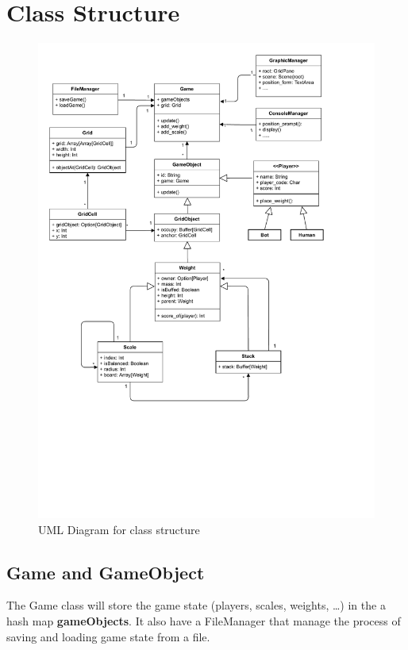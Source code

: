 \documentclass[12pt]{article}
\begin{document}
\section{Class Structure}
\begin{figure}
  \centering
  \caption{UML Diagram for class structure}
  \vspace*{1cm}
  \hspace*{1cm}
  \includegraphics[width=\textwidth]{UML Project.pdf}
\end{figure}
\subsection{Game and GameObject}
The Game class will store the game state (players, scales, weights, \dots) in
the a hash map \textbf{gameObjects}. It also have a FileManager that manage the
process of saving and loading game state from a file.
\end{document}
